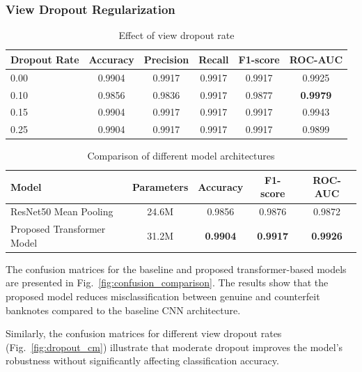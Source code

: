 \documentclass[preprint,12pt,authoryear]{elsarticle}
\begin{document}
\subsubsection{View Dropout Regularization}

\begin{table}[h]
\centering
\caption{Effect of view dropout rate}
\begin{tabular}{lccccc}
\hline
Dropout Rate & Accuracy & Precision & Recall & F1-score & ROC-AUC \\
\hline
0.00 & 0.9904 & 0.9917 & 0.9917 & 0.9917 & 0.9925 \\
0.10 & 0.9856 & 0.9836 & 0.9917 & 0.9877 & \textbf{0.9979} \\
0.15 & 0.9904 & 0.9917 & 0.9917 & 0.9917 & 0.9943 \\
0.25 & 0.9904 & 0.9917 & 0.9917 & 0.9917 & 0.9899 \\
\hline
\end{tabular}
\end{table}

\begin{table}[h]
\centering
\caption{Comparison of different model architectures}
\begin{tabular}{lcccc}
\hline
Model & Parameters & Accuracy & F1-score & ROC-AUC \\
\hline
ResNet50 Mean Pooling & 24.6M & 0.9856 & 0.9876 & 0.9872 \\
Proposed Transformer Model & 31.2M & \textbf{0.9904} & \textbf{0.9917} & \textbf{0.9926} \\
\hline
\end{tabular}
\end{table}

The confusion matrices for the baseline and proposed transformer-based models are presented in Fig.~\ref{fig:confusion_comparison}. The results show that the proposed model reduces misclassification between genuine and counterfeit banknotes compared to the baseline CNN architecture.

Similarly, the confusion matrices for different view dropout rates (Fig.~\ref{fig:dropout_cm}) illustrate that moderate dropout improves the model's robustness without significantly affecting classification accuracy.
\end{document}
